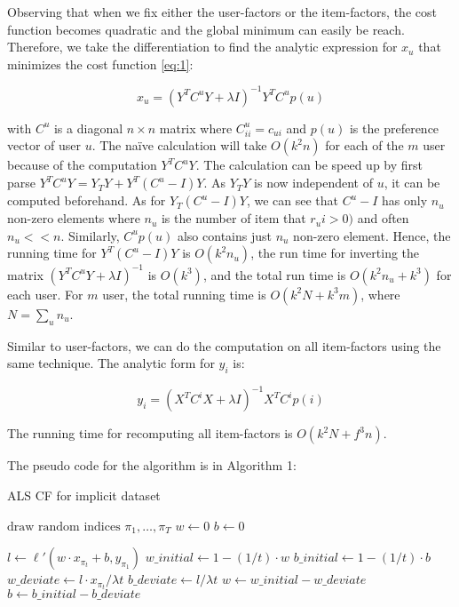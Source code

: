 Observing that when we fix either the user-factors or the item-factors, the cost function becomes quadratic and the global minimum can easily be reach. Therefore, we take the differentiation to find the analytic expression for \(x_u\) that minimizes the cost function \eqref{eq:1}:

\begin{displaymath}
x_u = (Y^T C^u Y + \lambda I)^{-1} Y^T C^u p(u)
\end{displaymath}

with \(C^u\) is a diagonal \(n \times n\) matrix where \(C^u_{ii} = c_{ui}\) and \(p(u)\) is the preference vector of user \(u\). The na\"ive calculation will take \(O(k^2n) \) for each of the \(m\) user because of the computation \(Y^T C^u Y\). The calculation can be speed up by first parse \(Y^T C^u Y = Y_TY + Y^T (C^u - I) Y \). As \(Y_TY\) is now independent of \(u\), it can be computed beforehand. As for \(Y_T (C^u - I)Y\), we can see that \(C^u - I\) has only \(n_u\) non-zero elements where \(n_u\) is the number of item that \(r_ui > 0) \) and often \(n_u << n\). Similarly, \(C^u p(u)\) also contains just \(n_u\) non-zero element. Hence, the running time for \(Y^T (C^u - I) Y\) is \(O(k^2 n_u)\), the run time for inverting the matrix \( (Y^T C^u Y + \lambda I)^{-1} \) is \(O(k^3) \), and the total run time is \(O(k^2 n_u + k^3)\) for each user. For \(m\) user, the total running time is \(O(k^2 N + k^3 m)\), where \(N = \sum_u n_u\). \hfill \break

\noindent Similar to user-factors, we can do the computation on all item-factors using the same technique. The analytic form for \(y_i\) is:

\begin{displaymath}
y_i = (X^T C^i X + \lambda I)^{-1} X^T C^i p(i)
\end{displaymath}

\noindent The running time for recomputing all item-factors is \(O(k^2 N + f^3n)\). \hfill \break

\noindent The pseudo code for the algorithm is in Algorithm 1:

\begin{algorithm}
\caption{ALS CF for implicit dataset} \label{ALSCF}
\begin{algorithmic}[1]
 
	\State $\text{draw random indices } \pi_1, \dots, \pi_T$ 
	\State $w \gets 0$
	\State $b \gets 0$
	
		\State $l \gets \ell'(w \cdot x_{\pi_t} + b, y_{\pi_1})$
		\State $w\_initial \gets 1 - (1 / t) \cdot w$
		\State $b\_initial \gets 1 - (1 / t) \cdot b$
		\State $w\_deviate \gets l \cdot x_{\pi_t} / \lambda t $
		\State $b\_deviate \gets l / \lambda t$
		\State $w \gets w\_initial - w\_deviate$
		\State $b \gets b\_initial - b\_deviate$
	\EndFor
	\Return [w, b]
\EndFunction
\end{algorithmic}
\end{algorithm}

